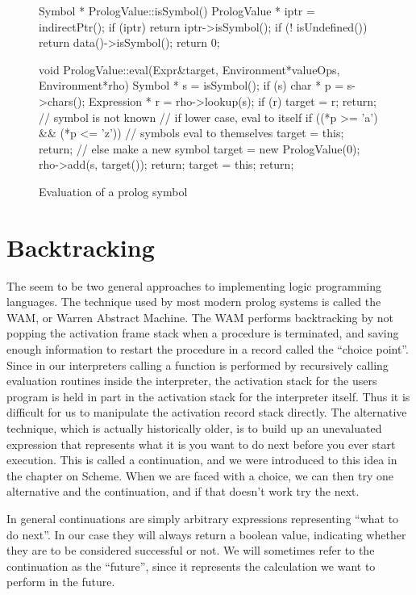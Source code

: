 \begin{figure}
\begin{cprog}
Symbol * PrologValue::isSymbol()
{
	PrologValue * iptr = indirectPtr();
	if (iptr)
		return iptr->isSymbol();
	if (! isUndefined())
		return data()->isSymbol();
	return 0;
}

void PrologValue::eval(Expr&target, Environment*valueOps, Environment*rho)
{
	Symbol * s = isSymbol();
	if (s) {
		char * p = s->chars();
		Expression * r = rho->lookup(s);
		if (r) {
			target = r;
			return;
			}
		// symbol is not known
		// if lower case, eval to itself
		if ((*p >= 'a') && (*p <= 'z')) {
			// symbols eval to themselves
			target = this;
			return;
			}
		// else make a new symbol
		target = new PrologValue(0);
		rho->add(s, target());
		return;
		}
	target = this;
	return;
}
\end{cprog}
\caption{Evaluation of a prolog symbol}\label{prologeval}
\end{figure}

\section{Backtracking}

The seem to be two general approaches to implementing logic programming
languages.  The technique used by most modern prolog systems is called the
WAM, or Warren Abstract Machine.  The WAM performs backtracking by not
popping the activation frame stack when a procedure is terminated, and
saving enough information to restart the procedure in a record called the
``choice point''.  Since in our interpreters calling a function is performed
by recursively calling evaluation routines inside the interpreter, the
activation stack for the users program is held in part in the activation
stack for the interpreter itself.  Thus it is difficult for us to
manipulate the activation record stack directly.
The alternative technique, which is actually historically older, is to
build up an unevaluated expression that represents what it is you want to 
do next before
you ever start execution.  This is called a continuation, and we were
introduced to this idea in the chapter on Scheme.
When we are faced with a choice, we can then try one alternative and the
continuation, and if that doesn't work try the next.

In general continuations are simply arbitrary expressions representing
``what to do next''.  In our case they will always return a boolean value,
indicating whether they are to be considered successful or not.
We will sometimes refer to the continuation as the ``future'', since it
represents the calculation we want to perform in the future.


